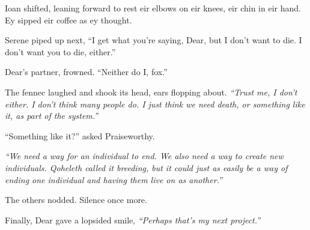 Ioan shifted, leaning forward to rest eir elbows on eir knees, eir chin in eir hand. Ey sipped eir coffee as ey thought.

Serene piped up next, ``I get what you're saying, Dear, but I don't want to die. I don't want you to die, either.''

Dear's partner, frowned. ``Neither do I, fox.''

The fennec laughed and shook its head, ears flopping about. \emph{``Trust me, I don't either. I don't think many people do. I just think we need death, or something like it, as part of the system.''}

``Something like it?'' asked Praiseworthy.

\emph{``We need a way for an individual to end. We also need a way to create new individuals. Qoheleth called it breeding, but it could just as easily be a way of ending one individual and having them live on as another.''}

The others nodded. Silence once more.

Finally, Dear gave a lopsided smile, \emph{``Perhaps that's my next project.''}
